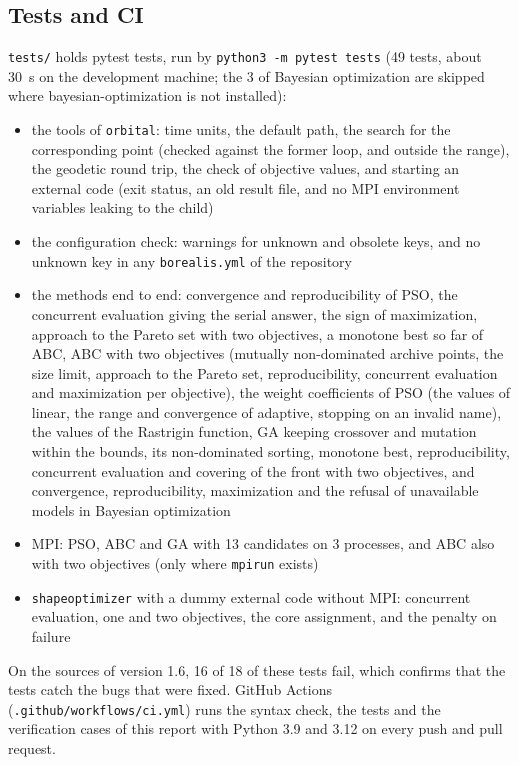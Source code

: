 \documentclass[11pt,a4paper]{article}
\begin{document}
\subsection{Tests and CI}\label{sec:tests}

\texttt{tests/} holds pytest tests, run by \texttt{python3 -m pytest tests} (49 tests, about 30~s on the development machine; the 3 of Bayesian optimization are skipped where bayesian-optimization is not installed):

\begin{itemize}
\item the tools of \texttt{orbital}: time units, the default path, the search for the corresponding point (checked against the former loop, and outside the range), the geodetic round trip, the check of objective values, and starting an external code (exit status, an old result file, and no MPI environment variables leaking to the child)
\item the configuration check: warnings for unknown and obsolete keys, and no unknown key in any \texttt{borealis.yml} of the repository
\item the methods end to end: convergence and reproducibility of PSO, the concurrent evaluation giving the serial answer, the sign of maximization, approach to the Pareto set with two objectives, a monotone best so far of ABC, ABC with two objectives (mutually non-dominated archive points, the size limit, approach to the Pareto set, reproducibility, concurrent evaluation and maximization per objective), the weight coefficients of PSO (the values of linear, the range and convergence of adaptive, stopping on an invalid name), the values of the Rastrigin function, GA keeping crossover and mutation within the bounds, its non-dominated sorting, monotone best, reproducibility, concurrent evaluation and covering of the front with two objectives, and convergence, reproducibility, maximization and the refusal of unavailable models in Bayesian optimization
\item MPI: PSO, ABC and GA with 13 candidates on 3 processes, and ABC also with two objectives (only where \texttt{mpirun} exists)
\item \texttt{shapeoptimizer} with a dummy external code without MPI: concurrent evaluation, one and two objectives, the core assignment, and the penalty on failure
\end{itemize}

On the sources of version 1.6, 16 of 18 of these tests fail, which confirms that the tests catch the bugs that were fixed. GitHub Actions (\texttt{.github/workflows/ci.yml}) runs the syntax check, the tests and the verification cases of this report with Python 3.9 and 3.12 on every push and pull request.
\end{document}
